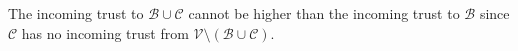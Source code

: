\begin{proofsketch}
   The incoming trust to $\mathcal{B} \cup \mathcal{C}$ cannot be higher than the incoming trust to $\mathcal{B}$ since
   $\mathcal{C}$ has no incoming trust from $\mathcal{V} \setminus \left(\mathcal{B} \cup \mathcal{C}\right)$.%
\end{proofsketch}
